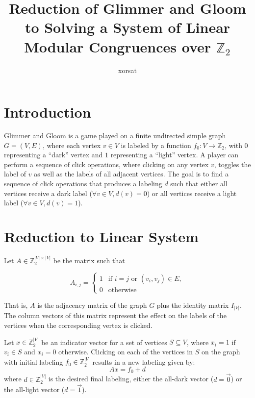 \documentclass{article}
\title{Reduction of Glimmer and Gloom to Solving a System of Linear Modular Congruences over \(\mathbb{Z}_2\)}
\author{xorsat}
\begin{document}
\maketitle

\section{Introduction}

Glimmer and Gloom is a game played on a finite undirected simple graph \( G = (V, E) \), where each vertex \( v \in V \) is labeled by a function \( f_0: V \to \mathbb{Z}_2 \), with \( 0 \) representing a ``dark'' vertex and \( 1 \) representing a ``light'' vertex. A player can perform a sequence of click operations, where clicking on any vertex \( v \),  toggles the label of \( v \) as well as the labels of all adjacent vertices. The goal is to find a sequence of click operations that produces a labeling \( d \) such that either all vertices receive a dark label (\(\forall v \in V, d(v) = 0 \)) or all vertices receive a light label (\( \forall v \in V, d(v) = 1 \)).

\section{Reduction to Linear System}

Let \( A \in \mathbb{Z}_2^{|V| \times |V|} \) be the matrix such that

\[
  A_{i,j} =
  \begin{cases}
        1 & \text{if } i = j \text{ or } (v_i, v_j) \in E, \\
        0 & \text{otherwise}
  \end{cases}
\]

That is, \( A \) is the adjacency matrix of the graph \( G \) plus the identity matrix \( I_{|V|} \). The column vectors of this matrix represent the effect on the labels of the vertices when the corresponding vertex is clicked.

Let  \( x \in \mathbb{Z}_2^{|V|} \) be an indicator vector for a set of vertices \( S \subseteq V \), where \( x_i = 1 \) if \( v_i \in S \) and \( x_i = 0 \) otherwise. Clicking on each of the vertices in \( S \) on the graph with initial labeling \( f_0 \in \mathbb{Z}_2^{|V|} \) results in a new labeling given by:
\[
    A x = f_0 + d
\]
where \( d \in \mathbb{Z}_2^{|V|} \) is the desired final labeling, either the all-dark vector (\( d = \vec{0} \)) or the all-light vector (\( d = \vec{1} \)).
\end{document}
